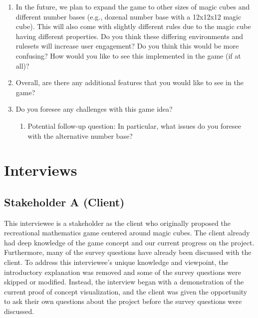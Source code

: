 \documentclass{article}
\begin{document}
\begin{enumerate}
\begin{enumerate}
        \item Do you think that this is a feature that would improve enjoyment and engagement?
        \item What information would you like to see on a competitive leaderboard?
        \item What other features would you like to see in this online, competitive section of the game?
    \end{enumerate}
    \item In the future, we plan to expand the game to other sizes of magic cubes and different number bases (e.g., dozenal number base with a 12x12x12 magic cube). This will also come with slightly different rules due to the magic cube having different properties. Do you think these differing environments and rulesets will increase user engagement? Do you think this would be more confusing? How would you like to see this implemented in the game (if at all)?
    \item Overall, are there any additional features that you would like to see in the game?
    \item Do you foresee any challenges with this game idea?
    \begin{enumerate}
        \item Potential follow-up question: In particular, what issues do you foresee with the alternative number base?
    \end{enumerate}
\end{enumerate}

\section{Interviews}

\subsection{Stakeholder A (Client)}

This interviewee is a stakeholder as the client who originally proposed the recreational mathematics game centered around magic cubes. The client already had deep knowledge of the game concept and our current progress on the project. Furthermore, many of the survey questions have already been discussed with the client. To address this interviewee's unique knowledge and viewpoint, the introductory explanation was removed and some of the survey questions were skipped or modified. Instead, the interview began with a demonstration of the current proof of concept visualization, and the client was given the opportunity to ask their own questions about the project before the survey questions were discussed.
\end{document}
